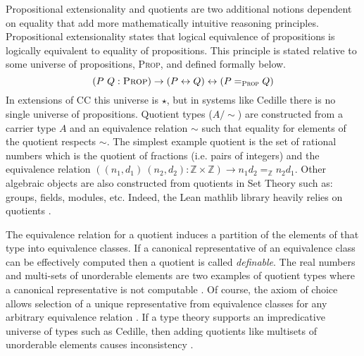 Propositional extensionality and quotients are two additional notions dependent on equality that add more mathematically intuitive reasoning principles.
Propositional extensionality states that logical equivalence of propositions is logically equivalent to equality of propositions.
This principle is stated relative to some universe of propositions, \textsc{Prop}, and defined formally below.
$$(P\ Q : \textsc{Prop}) \to (P \leftrightarrow Q) \leftrightarrow (P =_\textsc{Prop} Q)$$
In extensions of CC this universe is $\star$, but in systems like Cedille there is no single universe of propositions.
Quotient types ($A/\!\!\sim$) are constructed from a carrier type $A$ and an equivalence relation $\sim$ such that equality for elements of the quotient respects $\sim$.
The simplest example quotient is the set of rational numbers which is the quotient of fractions (i.e. pairs of integers) and the equivalence relation $((n_1, d_1)\ (n_2, d_2) : \mathbb{Z \times Z}) \to n_1d_2 =_{\mathbb{Z}} n_2d_1$.
Other algebraic objects are also constructed from quotients in Set Theory such as: groups, fields, modules, etc.
Indeed, the Lean mathlib library heavily relies on quotients \cite{mathlib}.

The equivalence relation for a quotient induces a partition of the elements of that type into equivalence classes.
If a canonical representative of an equivalence class can be effectively computed then a quotient is called \textit{definable}.
The real numbers and multi-sets of unorderable elements are two examples of quotient types where a canonical representative is not computable \cite{li2015}.
Of course, the axiom of choice allows selection of a unique representative from equivalence classes for any arbitrary equivalence relation \cite{lof2009}.
If a type theory supports an impredicative universe of types such as Cedille, then adding quotients like multisets of unorderable elements causes inconsistency \cite{chicli2002}.


